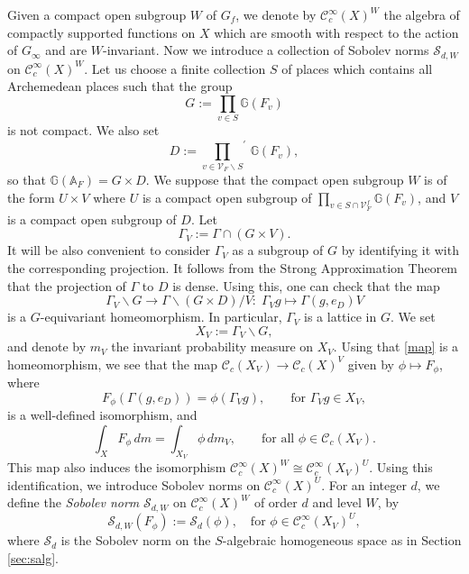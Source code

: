 \documentclass[11pt,reqno,a4paper]{amsart}
\numberwithin{equation}{section}
\newcommand{\cC}{\mathcal{C}}
\newcommand{\cS}{\mathcal{S}}
\newcommand{\bA}{\mathbb{A}}
\newcommand{\bG}{\mathbb{G}}
\newcommand{\ra}{\rightarrow}
\theoremstyle{theorem}
\theoremstyle{definition}
\begin{document}
Given a compact open subgroup $W$ of $G_f$, we denote by $\cC_c^\infty(X)^W$
the algebra of compactly supported functions on $X$ which are smooth with respect to the action of $G_\infty$ and are $W$-invariant. 
Now we introduce a collection of Sobolev norms $\cS_{d,W}$ on $\cC_c^\infty(X)^W$. 
Let us choose a finite collection $S$ of places
which contains all Archemedean places such that the group
$$
G:=\prod_{v\in S} \bG(F_v)
$$
is not compact.
We also set 
$$
D:={\prod_{v\in\mathcal{V}_F\backslash S}}^{\!\!\!\!\!\!\prime}\, \bG(F_v),
$$
so that $\bG(\bA_F)=G\times D$.
We suppose that the compact open subgroup $W$ is of the form 
$U\times V$ where $U$ is a compact open subgroup of $\prod_{v\in S\cap \mathcal{V}^f_F} \bG(F_v)$, and $V$ is a compact open subgroup of $D$.
Let 
$$
\Gamma_V := \Gamma \cap ({G}\times V).
$$
It will be also convenient to consider $\Gamma_V$ as a subgroup of $G$
by identifying it with the corresponding projection.
It follows from the Strong Approximation Theorem \cite[\S7.4]{PR}
that the projection of $\Gamma$ to $D$ is dense.
Using this, one can check  that the map 
\begin{equation}
\label{map}
\Gamma_V \backslash G \ra \Gamma \backslash (G \times D)/V: \; \Gamma_V g \mapsto \Gamma(g,e_D)V
\end{equation}
is a $G$-equivariant homeomorphism. 
In particular, $\Gamma_V$ is a lattice in $G$.
We set
\[
X_V := \Gamma_V \backslash G,
\]
and denote by $m_V$ the invariant probability measure on $X_V$.
Using that \eqref{map} is a homeomorphism,
we see that the map $\cC_c(X_V)\ra\cC_c(X)^V$ given by $\phi \mapsto F_\phi$, where
\begin{equation}
\label{mapf}
F_\phi(\Gamma(g,e_D))=\phi(\Gamma_V g), \quad\quad \textrm{for $\Gamma_V g \in X_V$},
\end{equation}
is a well-defined isomorphism, and
\[
\int_X F_\phi \, dm = \int_{X_V} \phi \, dm_V, \quad \quad \textrm{for all $\phi \in\cC_c(X_V)$}.
\]
This map also induces the isomorphism $\cC^\infty_c(X)^W \cong \cC^\infty_c(X_V)^U$.
Using this identification, we introduce Sobolev norms on $\cC^\infty_c(X)^U$.
For an integer $d$, we define the \emph{Sobolev norm} $\cS_{d,W}$ on $\cC^\infty_c(X)^W$ of 
order $d$ and level $W$, by
\begin{equation}\label{eq:SSS}
\cS_{d,W}(F_\phi) := \cS_d(\phi), \quad \textrm{for $\phi \in \cC^\infty_c(X_V)^U$},
\end{equation}
where $\cS_d$ is the Sobolev norm on the $S$-algebraic homogeneous space
as in Section \ref{sec:salg}.
\end{document}
